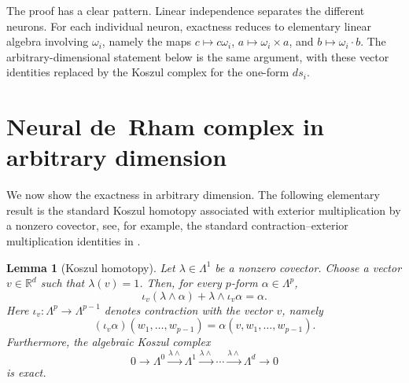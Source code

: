 \documentclass[pdflatex,sn-mathphys-num]{sn-jnl}
\newtheorem{lemma}[theorem]{Lemma}
\numberwithin{equation}{section}
\numberwithin{theorem}{section}
\numberwithin{table}{section}
\numberwithin{figure}{section}
\begin{document}
The proof has a clear pattern.  Linear independence separates the different neurons.
For each individual neuron, exactness reduces to elementary linear algebra involving
$\omega_i$, namely the maps $c\mapsto c\omega_i$, $a\mapsto\omega_i\times a$, and
$b\mapsto\omega_i\cdot b$.  The arbitrary-dimensional statement below is the same argument,
with these vector identities replaced by the Koszul complex for the one-form $ds_i$.

\section{Neural de~Rham complex in arbitrary dimension}\label{sec:main}
We now show the exactness in arbitrary dimension. The following elementary result is the standard Koszul homotopy associated with exterior multiplication by a nonzero covector, see, for example, the standard contraction–exterior multiplication identities in \cite[Chapter 1]{bott1982differential}.

\begin{lemma}[Koszul homotopy]\label{lem:koszul}
Let $\lambda\in\Lambda^1$ be a nonzero covector. Choose a vector $v\in\mathbb R^d$ such that $\lambda(v)=1$. Then, for every $p$-form $\alpha\in\Lambda^p$,
\begin{equation}\label{eq:homo}
\iota_v(\lambda\wedge \alpha)+\lambda\wedge \iota_v\alpha=\alpha.
\end{equation}
Here $\iota_v:\Lambda^p\rightarrow\Lambda^{p-1}$ denotes contraction with the vector $v$, namely
\begin{equation}
(\iota_v\alpha)(w_1,\ldots,w_{p-1})=\alpha(v,w_1,\ldots,w_{p-1}).
\end{equation}
Furthermore, the algebraic Koszul complex
\begin{equation}
0\longrightarrow \Lambda^0
\xrightarrow{\lambda\wedge}
\Lambda^1
\xrightarrow{\lambda\wedge}
\cdots
\xrightarrow{\lambda\wedge}
\Lambda^d
\longrightarrow 0
\end{equation}
is exact.
\end{lemma}
\end{document}
